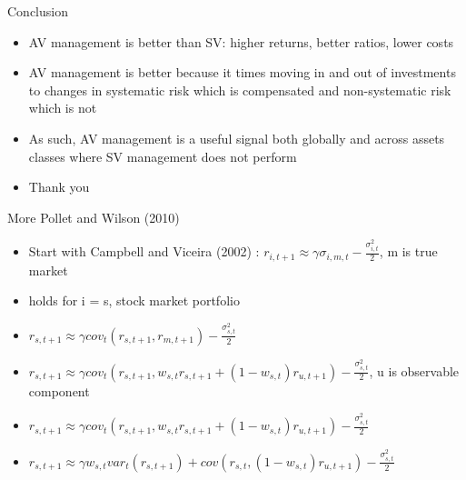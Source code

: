 \documentclass{beamer}
\begin{document}
\begin{frame}{Conclusion}
	\begin{itemize}
		\item AV management is better than SV: higher returns, better ratios, lower costs
		\item AV management is better because it times moving in and out of investments to changes in systematic risk which is compensated and non-systematic risk which is not
		\item As such, AV management is a useful signal both globally and across assets classes where SV management does not perform
		\item Thank you
	\end{itemize}
\end{frame}



\begin{frame}{More Pollet and Wilson (2010)}
	\hypertarget{PWII}{}
	\begin{itemize}
		\item Start with Campbell and Viceira (2002) : $r_{i,t+1} \approx \gamma\sigma_{i,m,t} - \frac{\sigma_{i,t}^{2}}{2}$, m is true market
		\item holds for i = s, stock market portfolio
		\item $r_{s,t+1} \approx \gamma cov_{t}(r_{s,t+1},r_{m,t+1}) - \frac{\sigma_{s,t}^{2}}{2}$ 
		\item $r_{s,t+1} \approx \gamma cov_{t}(r_{s,t+1},w_{s,t}r_{s,t+1}+(1-w_{s,t})r_{u,t+1}) - \frac{\sigma_{s,t}^{2}}{2}$, u is observable component
		\item $r_{s,t+1} \approx \gamma cov_{t}(r_{s,t+1},w_{s,t}r_{s,t+1}+(1-w_{s,t})r_{u,t+1}) - \frac{\sigma_{s,t}^{2}}{2}$ 
		\item $r_{s,t+1} \approx \gamma w_{s,t} var_{t}(r_{s,t+1})+cov(r_{s,t},(1-w_{s,t})r_{u,t+1}) - \frac{\sigma_{s,t}^{2}}{2}$ 
	\end{itemize}
\end{frame}
\end{document}
